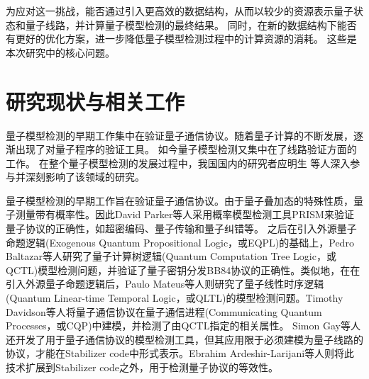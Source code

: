 为应对这一挑战，能否通过引入更高效的数据结构，从而以较少的资源表示量子状态和量子线路，并计算量子模型检测的最终结果。
同时，在新的数据结构下能否有更好的优化方案，进一步降低量子模型检测过程中的计算资源的消耗。
这些是本次研究中的核心问题。
\section{研究现状与相关工作}
量子模型检测的早期工作集中在验证量子通信协议。随着量子计算的不断发展，逐渐出现了对量子程序的验证工具。
如今量子模型检测又集中在了线路验证方面的工作。
在整个量子模型检测的发展过程中，我国国内的研究者应明生
等人深入参与并深刻影响了该领域的研究。

量子模型检测的早期工作旨在验证量子通信协议。由于量子叠加态的特殊性质，量子测量带有概率性。因此David Parker等人采用概率模型检测工具PRISM\citep{kwiatkowska2004probabilistic}来验证量子协议的正确性，如超密编码、量子传输和量子纠错等。
之后在引入外源量子命题逻辑(Exogenous Quantum Propositional Logic，或EQPL)\citep{mateus2006weakly}的基础上，Pedro Baltazar等人研究了量子计算树逻辑(Quantum Computation Tree Logic，或QCTL)模型检测问题，并验证了量子密钥分发BB84协议\citep{bennett2014quantum}的正确性\citep{baltazar2008quantum,baltazar2007towards}。类似地，在在引入外源量子命题逻辑后，Paulo Mateus等人则研究了量子线性时序逻辑(Quantum Linear-time Temporal Logic，或QLTL)的模型检测问题\citep{mateus2009temporal}。Timothy Davidson等人将量子通信协议在量子通信进程(Communicating Quantum Processes，或CQP)\citep{gay2005communicating}中建模，并检测了由QCTL指定的相关属性\citep{davidson2012formal,davidson2012model}。
Simon Gay等人还开发了用于量子通信协议的模型检测工具\citep{Gay,gay2010specification}，但其应用限于必须建模为量子线路的协议，才能在Stabilizer code\citep{gottesman1997stabilizer}中形式表示。Ebrahim Ardeshir-Larijani等人则将此技术扩展到Stabilizer code之外，用于检测量子协议的等效性\citep{ardeshir2013equivalence,ardeshir2014verification}。


